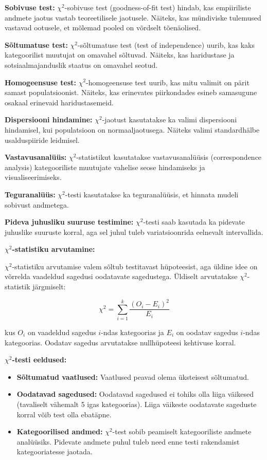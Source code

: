 \documentclass[
]{book}
\providecommand{\tightlist}{%
  \setlength{\itemsep}{0pt}\setlength{\parskip}{0pt}}
\theoremstyle{definition}
\theoremstyle{definition}
\theoremstyle{definition}
\theoremstyle{definition}
\theoremstyle{remark}
\begin{document}
\textbf{Sobivuse test:} \(\chi^2\)-sobivuse test (goodness-of-fit test) hindab, kas empiiriliste andmete jaotus vastab teoreetilisele jaotusele. Näiteks, kas mündiviske tulemused vastavad ootusele, et mõlemad pooled on võrdselt tõenäolised.

\textbf{Sõltumatuse test:} \(\chi^2\)-sõltumatuse test (test of independence) uurib, kas kaks kategoorilist muutujat on omavahel sõltuvad. Näiteks, kas haridustase ja sotsiaalmajanduslik staatus on omavahel seotud.

\textbf{Homogeensuse test:} \(\chi^2\)-homogeensuse test uurib, kas mitu valimit on pärit samast populatsioonist. Näiteks, kas erinevates piirkondades esineb samasugune osakaal erinevaid haridustasemeid.

\textbf{Dispersiooni hindamine:} \(\chi^2\)-jaotust kasutatakse ka valimi dispersiooni hindamisel, kui populatsioon on normaaljaotusega. Näiteks valimi standardhälbe usalduspiiride leidmisel.

\textbf{Vastavusanalüüs:} \(\chi^2\)-statistikut kasutatakse vastavusanalüüsis (correspondence analysis) kategooriliste muutujate vahelise seose hindamiseks ja visualiseerimiseks.

\textbf{Teguranalüüs:} \(\chi^2\)-testi kasutatakse ka teguranalüüsis, et hinnata mudeli sobivust andmetega.

\textbf{Pideva juhusliku suuruse testimine:} \(\chi^2\)-testi saab kasutada ka pidevate juhuslike suuruste korral, aga sel juhul tuleb variatsioonrida eelnevalt intervallida.

\textbf{\(\chi^2\)-statistiku arvutamine:}

\(\chi^2\)-statistiku arvutamise valem sõltub testitavast hüpoteesist, aga üldine idee on võrrelda vaadeldud sagedusi oodatavate sagedustega. Üldiselt arvutatakse \(\chi^2\)-statistik järgmiselt:

\[\chi^2 = \sum_{i=1}^k \frac{(O_i - E_i)^2}{E_i}\]

kus \(O_i\) on vaadeldud sagedus \(i\)-ndas kategoorias ja \(E_i\) on oodatav sagedus \(i\)-ndas kategoorias. Oodatav sagedus arvutatakse nullhüpoteesi kehtivuse korral.

\textbf{\(\chi^2\)-testi eeldused:}

\begin{itemize}
\tightlist
\item
  \textbf{Sõltumatud vaatlused:} Vaatlused peavad olema üksteisest sõltumatud.
\item
  \textbf{Oodatavad sagedused:} Oodatavad sagedused ei tohiks olla liiga väikesed (tavaliselt vähemalt 5 igas kategoorias). Liiga väikeste oodatavate sageduste korral võib test olla ebatäpne.
\item
  \textbf{Kategoorilised andmed:} \(\chi^2\)-test sobib peamiselt kategooriliste andmete analüüsiks. Pidevate andmete puhul tuleb need enne testi rakendamist kategooriatesse jaotada.
\end{itemize}
\end{document}
